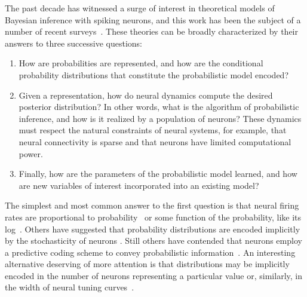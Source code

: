The past decade has witnessed a surge of interest in theoretical
models of Bayesian inference with spiking neurons, and this work has
been the subject of a number of recent surveys~\cite{Simoncelli2009,
  fiser2010statistically, pouget2013probabilistic, ma2014neural}.
These theories can be broadly characterized by their answers to three
successive questions:
\begin{enumerate}
\item How are probabilities are represented, and how are the conditional
  probability distributions that constitute the probabilistic model
  encoded?
\item Given a representation, how do neural dynamics compute the
  desired posterior distribution? In other words, what is the
  algorithm of probabilistic inference, and how is it realized by a
  population of neurons? These dynamics must respect the natural
  constraints of neural systems, for example, that neural connectivity
  is sparse and that neurons have limited computational power.
\item Finally, how are the parameters of the probabilistic model
  learned, and how are new variables of interest incorporated into
  an existing model?
\end{enumerate}
The simplest and most common answer to the first question is that
neural firing rates are proportional to probability~\cite{Hinton1983,
  Hinton1992, Anderson1994, Barber2003, Buesing2011, Berkes2011,
  nessler2013bayesian, legenstein2014ensembles} or some function of
the probability, like its log~\cite{Rao2004, beck2007exact, Rao2007,
  litvak2009cortical}. Others have suggested that probability
distributions are encoded implicitly by the stochasticity of neurons
\cite{Zemel1998, Sahani2003, Ma2006}. Still others have contended that
neurons employ a predictive coding scheme to convey probabilistic
information~\cite{Rao1999, Deneve2008a, Huang2011}.  An interesting
alternative deserving of more attention is that distributions may be
implicitly encoded in the number of neurons representing a particular
value or, similarly, in the width of neural tuning
curves~\cite{Shi2009, Ganguli2010}. 

